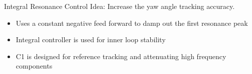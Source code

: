 \documentclass[10pt]{beamer}
\begin{document}
\begin{frame}{Integral Resonance Control}
  \alert{Idea}: Increase the yaw angle tracking accuracy.
  \begin{itemize}
    \item Uses a constant negative feed forward to damp out the first resonance peak
    \item Integral controller is used for inner loop stability
    \item C1 is designed for reference tracking and attenuating high frequency components
  \end{itemize}
  \vspace{-1cm}
  \begin{figure}[h!]
    \centering %
     \\ \vspace{-1cm}
  \end{figure}
\end{frame}
\end{document}
